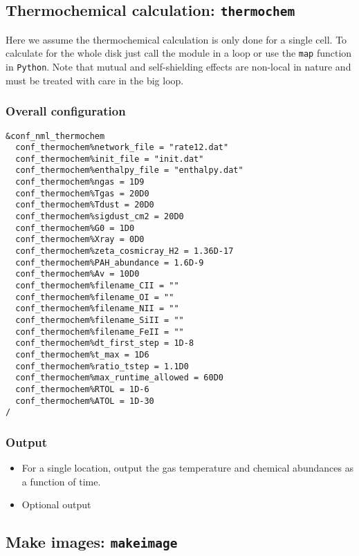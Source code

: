 \documentclass{article}
\newcommand{\cds}[1]{\texttt{#1}}
\newcommand{\python}{\texttt{Python}}
\newcommand{\thermochem}{\texttt{thermochem}}
\newcommand{\makeimage}{\texttt{makeimage}}
\begin{document}
\subsection{Thermochemical calculation: \thermochem}

Here we assume the thermochemical calculation is only done for a single cell.  To calculate for the whole disk just call the module in a loop or use the \cds{map} function in \python.  Note that mutual and self-shielding effects are non-local in nature and must be treated with care in the big loop.

\subsubsection{Overall configuration}

\begin{lstlisting}
&conf_nml_thermochem
  conf_thermochem%network_file = "rate12.dat"
  conf_thermochem%init_file = "init.dat"
  conf_thermochem%enthalpy_file = "enthalpy.dat"
  conf_thermochem%ngas = 1D9
  conf_thermochem%Tgas = 20D0
  conf_thermochem%Tdust = 20D0
  conf_thermochem%sigdust_cm2 = 20D0
  conf_thermochem%G0 = 1D0
  conf_thermochem%Xray = 0D0
  conf_thermochem%zeta_cosmicray_H2 = 1.36D-17
  conf_thermochem%PAH_abundance = 1.6D-9
  conf_thermochem%Av = 10D0
  conf_thermochem%filename_CII = ""
  conf_thermochem%filename_OI = ""
  conf_thermochem%filename_NII = ""
  conf_thermochem%filename_SiII = ""
  conf_thermochem%filename_FeII = ""
  conf_thermochem%dt_first_step = 1D-8
  conf_thermochem%t_max = 1D6
  conf_thermochem%ratio_tstep = 1.1D0
  conf_thermochem%max_runtime_allowed = 60D0
  conf_thermochem%RTOL = 1D-6
  conf_thermochem%ATOL = 1D-30
/
\end{lstlisting}

\subsubsection{Output}

\begin{itemize}
  \item For a single location, output the gas temperature and chemical abundances as a function of time.
  \item Optional output
\end{itemize}  

\subsection{Make images: \makeimage}
\end{document}
